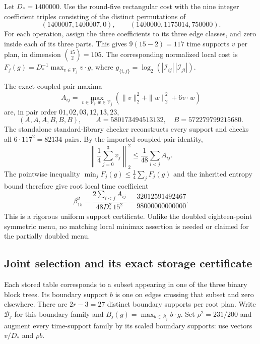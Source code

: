 Let $D_*=1400000$. Use the round-five rectangular cost with the nine
integer coefficient triples consisting of the distinct permutations of
\[
 (1400007,1400007,0),\qquad(1400000,1175014,750000).
\]
For each operation, assign the three coefficients to its three edge
classes, and zero inside each of its three parts. This gives
$9(15-2)=117$ time supports $v$ per plan, in dimension $\binom{15}{2}=105$.
The corresponding normalized local cost is
$F_j(g)=D_*^{-1}\max_{v\in\mathcal V_j}v\cdot g$, where
$g_{\{i,j\}}=\log_2(|\mathcal I_{ij}|\,|\mathcal I_{ji}|)$.

The exact coupled pair maxima
\[
 A_{ij}=\max_{v\in\mathcal V_i,w\in\mathcal V_j}
       (\|v\|_2^2+\|w\|_2^2+6v\cdot w)
\]
are, in pair order $01,02,03,12,13,23$,
\[
 (A,A,A,B,B,B),\qquad
 A=580173494513132,\quad B=572279799215680.
\]
The standalone standard-library checker reconstructs every support and
checks all $6\cdot117^2=82134$ pairs. By the imported coupled-pair identity,
\[
 \left\|\frac14\sum_{j=0}^3v_j\right\|_2^2
 \le\frac1{48}\sum_{i<j}A_{ij}.
\]
The pointwise inequality $\min_jF_j(g)\le\tfrac14\sum_jF_j(g)$ and the
inherited entropy bound therefore give root local time coefficient
\[
 \beta_{15}^2=
 \frac{2\sum_{i<j}A_{ij}}{48D_*^2\,15^2}
 =\frac{32012591492467}{98000000000000}.
\]
This is a rigorous uniform support certificate. Unlike the doubled
eighteen-point symmetric menu, no matching local minimax assertion is
needed or claimed for the partially doubled menu.

\subsection{Joint selection and its exact storage certificate}

Each stored table corresponds to a subset appearing in one of the three
binary block trees. Its boundary support $b$ is one on edges crossing
that subset and zero elsewhere. There are $2r-3=27$ distinct boundary
supports per root plan. Write $\mathcal B_j$ for this boundary family and
$B_j(g)=\max_{b\in\mathcal B_j}b\cdot g$. Set $\rho^2=231/200$ and augment every time-support
family by its scaled boundary supports: use vectors $v/D_*$ and $\rho b$.

